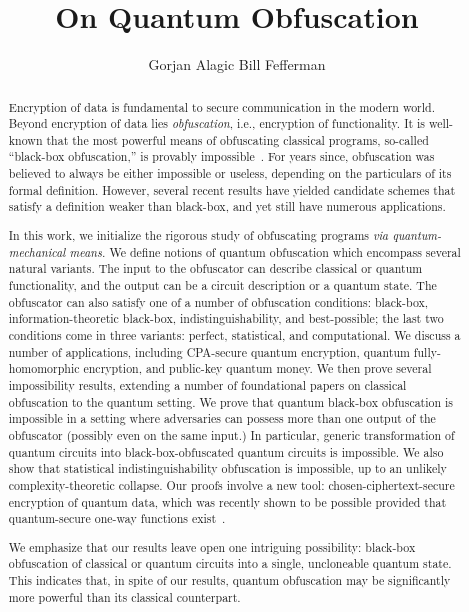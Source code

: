 \documentclass[envcountsame]{llncs}
\title{On Quantum Obfuscation}
\author{Gorjan Alagic \inst{1} Bill Fefferman \inst{2}}
\institute{Department of Mathematical Sciences, University of Copenhagen, Copenhagen, Denmark\\
\email{galagic@gmail.com}
\and Joint Center for Quantum Information and Computer Science (QuICS), University of Maryland, College Park, MD, USA\\
\email{wjf@umd.edu}}
\numberwithin{equation}{section}
\begin{document}
\mainmatter


\maketitle
\thispagestyle{plain}

\begin{abstract}
Encryption of data is fundamental to secure communication in the modern world. Beyond encryption of data lies \emph{obfuscation}, i.e., encryption of functionality. It is well-known that the most powerful means of obfuscating classical programs, so-called ``black-box obfuscation,'' is provably impossible~\cite{BGIRSVY01}. For years since, obfuscation was believed to always be either impossible or useless, depending on the particulars of its formal definition. However, several recent results have yielded candidate schemes that satisfy a definition weaker than black-box, and yet still have numerous applications.

In this work, we initialize the rigorous study of obfuscating programs \emph{via quantum-mechanical means.} We define notions of quantum obfuscation which encompass several natural variants. The input to the obfuscator can describe classical or quantum functionality, and the output can be a circuit description or a quantum state. The obfuscator can also satisfy one of a number of obfuscation conditions: black-box, information-theoretic black-box, indistinguishability, and best-possible; the last two conditions come in three variants: perfect, statistical, and computational. We discuss a number of applications, including CPA-secure quantum encryption, quantum fully-homomorphic encryption, and public-key quantum money. We then prove several impossibility results, extending a number of foundational papers on classical obfuscation to the quantum setting. We prove that quantum black-box obfuscation is impossible in a setting where adversaries can possess more than one output of the obfuscator (possibly even on the same input.) In particular, generic transformation of quantum circuits into black-box-obfuscated quantum circuits is impossible. We also show that statistical indistinguishability obfuscation is impossible, up to an unlikely complexity-theoretic collapse. Our proofs involve a new tool: chosen-ciphertext-secure encryption of quantum data, which was recently shown to be possible provided that quantum-secure one-way functions exist~\cite{ABFGSS16}. 

We emphasize that our results leave open one intriguing possibility: black-box obfuscation of classical or quantum circuits into a single, uncloneable  quantum state. This indicates that, in spite of our results, quantum obfuscation may be significantly more powerful than its classical counterpart.
\end{abstract}
\end{document}
